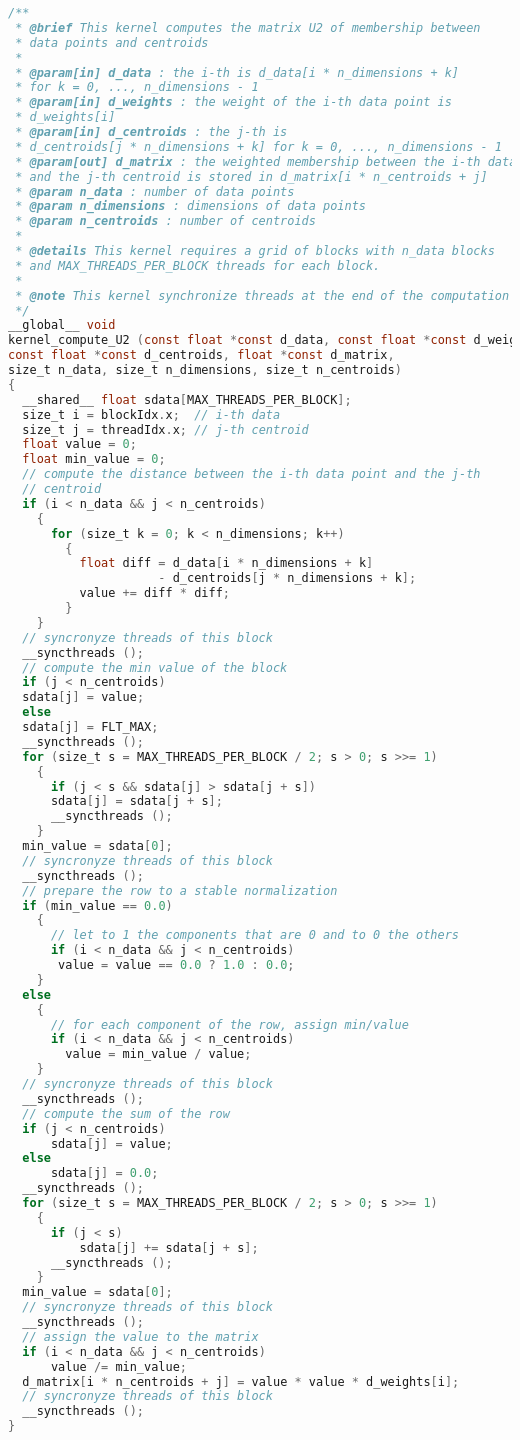 \begin{lstlisting}[style=code, language=C, rulecolor=\color{blue}]
/**
 * @brief This kernel computes the matrix U2 of membership between
 * data points and centroids
 *
 * @param[in] d_data : the i-th is d_data[i * n_dimensions + k]
 * for k = 0, ..., n_dimensions - 1
 * @param[in] d_weights : the weight of the i-th data point is
 * d_weights[i]
 * @param[in] d_centroids : the j-th is
 * d_centroids[j * n_dimensions + k] for k = 0, ..., n_dimensions - 1
 * @param[out] d_matrix : the weighted membership between the i-th data point
 * and the j-th centroid is stored in d_matrix[i * n_centroids + j]
 * @param n_data : number of data points
 * @param n_dimensions : dimensions of data points
 * @param n_centroids : number of centroids
 *
 * @details This kernel requires a grid of blocks with n_data blocks
 * and MAX_THREADS_PER_BLOCK threads for each block.
 *
 * @note This kernel synchronize threads at the end of the computation
 */
__global__ void
kernel_compute_U2 (const float *const d_data, const float *const d_weights,
const float *const d_centroids, float *const d_matrix,
size_t n_data, size_t n_dimensions, size_t n_centroids)
{
  __shared__ float sdata[MAX_THREADS_PER_BLOCK];
  size_t i = blockIdx.x;  // i-th data
  size_t j = threadIdx.x; // j-th centroid
  float value = 0;
  float min_value = 0;
  // compute the distance between the i-th data point and the j-th
  // centroid
  if (i < n_data && j < n_centroids)
    {
      for (size_t k = 0; k < n_dimensions; k++)
        {
          float diff = d_data[i * n_dimensions + k]
                     - d_centroids[j * n_dimensions + k];
          value += diff * diff;
        }
    }
  // syncronyze threads of this block
  __syncthreads ();
  // compute the min value of the block
  if (j < n_centroids)
  sdata[j] = value;
  else
  sdata[j] = FLT_MAX;
  __syncthreads ();
  for (size_t s = MAX_THREADS_PER_BLOCK / 2; s > 0; s >>= 1)
    {
      if (j < s && sdata[j] > sdata[j + s])
      sdata[j] = sdata[j + s];
      __syncthreads ();
    }
  min_value = sdata[0];
  // syncronyze threads of this block
  __syncthreads ();
  // prepare the row to a stable normalization
  if (min_value == 0.0)
    {
      // let to 1 the components that are 0 and to 0 the others
      if (i < n_data && j < n_centroids)
       value = value == 0.0 ? 1.0 : 0.0;
    }
  else
    {
      // for each component of the row, assign min/value
      if (i < n_data && j < n_centroids)
        value = min_value / value;
    }
  // syncronyze threads of this block
  __syncthreads ();
  // compute the sum of the row
  if (j < n_centroids)
      sdata[j] = value;
  else
      sdata[j] = 0.0;
  __syncthreads ();
  for (size_t s = MAX_THREADS_PER_BLOCK / 2; s > 0; s >>= 1)
    {
      if (j < s)
          sdata[j] += sdata[j + s];
      __syncthreads ();
    }
  min_value = sdata[0];
  // syncronyze threads of this block
  __syncthreads ();
  // assign the value to the matrix
  if (i < n_data && j < n_centroids)
      value /= min_value;
  d_matrix[i * n_centroids + j] = value * value * d_weights[i];
  // syncronyze threads of this block
  __syncthreads ();
}\end{lstlisting}
